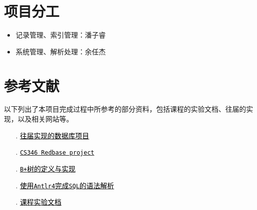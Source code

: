 \documentclass[11pt]{article}
\begin{document}
\section{项目分工}
\begin{itemize}
    \item 记录管理、索引管理：潘子睿
    \item 系统管理、解析处理：余任杰
\end{itemize}

\section{参考文献}
以下列出了本项目完成过程中所参考的部分资料，包括课程的实验文档、往届的实现，以及相关网站等。
\begin{enumerate}
    \item[\romannumeral1.] \href{https://github.com/miskcoo/TrivialDB}{\textcolor{black}{往届实现的数据库项目}}
    \item[\romannumeral2.] \href{https://web.stanford.edu/class/cs346/2015/redbase.html}{\textcolor{black}{\texttt{CS346 Redbase project}}}
    \item[\romannumeral3.] \href{https://en.wikipedia.org/wiki/B%2B_tree}{\textcolor{black}{\texttt{B+}树的定义与实现}}
    \item[\romannumeral4.] \href{https://www.antlr.org/download.html}{\textcolor{black}{使用\texttt{Antlr4}完成\texttt{SQL}的语法解析}}
    \item[\romannumeral5.] \href{https://thu-db.github.io/dbs-tutorial/}{\textcolor{black}{课程实验文档}}
\end{enumerate}
\end{document}
